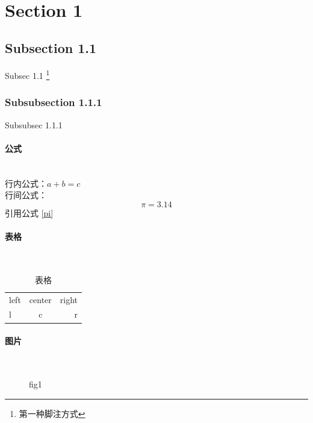 \documentclass[UTF8, a4paper]{ctexart}
\begin{document}
\newpage
\ \\[50pt]
\begin{spacing}{2}
    \tableofcontents    %
\end{spacing}
\newpage
\section{Section 1} \label{sec1}
\subsection{Subsection 1.1}
Subsec 1.1  \footnote{第一种脚注方式}
\subsubsection{Subsubsection 1.1.1}
Subsubsec 1.1.1 \footnotemark
{}

\paragraph{公式}~{}\\
行内公式：$a+b=c$\\
行间公式：
\begin{equation}
    \label{pi}
    \pi=3.14 \tag{1} 
\end{equation}
引用公式 \eqref{pi}

\paragraph{表格}~{}
\begin{table}[!htbp]
    \setlength{\abovecaptionskip}{0cm}      %
    \setlength{\belowcaptionskip}{0.2cm}    %
    \caption{表格}
    \centering
    \begin{tabular}{|l|c|r|}    %
        \hline
        left & center & right \\
        l & c & r\\
        \hline
    \end{tabular}
\end{table}

\paragraph{图片}~{}
\begin{figure}[!htbp]
    \centering  %
    \begin{minipage}{10em}
        \centering
        \caption{fig1}    
    \end{minipage}
\end{figure}
\end{document}

